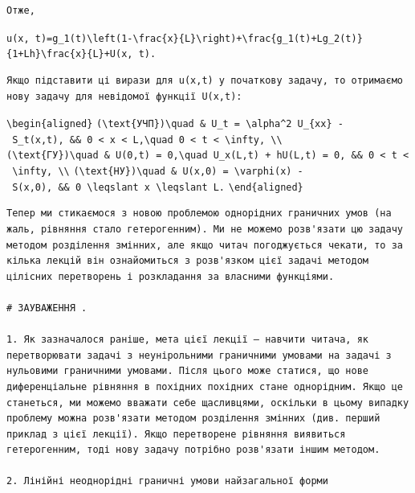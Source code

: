 \documentclass[
  ukrainian,
]{article}
\begin{document}
\begin{verbatim}
Отже,
\end{verbatim}

\texttt{u(x,\ t)=g\_1(t)\textbackslash{}left(1-\textbackslash{}frac\{x\}\{L\}\textbackslash{}right)+\textbackslash{}frac\{g\_1(t)+Lg\_2(t)\}\{1+Lh\}\textbackslash{}frac\{x\}\{L\}+U(x,\ t).}

\begin{verbatim}
Якщо підставити ці вирази для u(x,t) у початкову задачу, то отримаємо нову задачу для невідомої функції U(x,t):
\end{verbatim}

\texttt{\textbackslash{}begin\{aligned\}}
\texttt{(\textbackslash{}text\{УЧП\})\textbackslash{}quad\ \&\ U\_t\ =\ \textbackslash{}alpha\^{}2\ U\_\{xx\}\ -\ S\_t(x,t),\ \&\&\ 0\ \textless{}\ x\ \textless{}\ L,\textbackslash{}quad\ 0\ \textless{}\ t\ \textless{}\ \textbackslash{}infty,\ \textbackslash{}\textbackslash{}}
\texttt{(\textbackslash{}text\{ГУ\})\textbackslash{}quad\ \&\ U(0,t)\ =\ 0,\textbackslash{}quad\ U\_x(L,t)\ +\ hU(L,t)\ =\ 0,\ \&\&\ 0\ \textless{}\ t\ \textless{}\ \textbackslash{}infty,\ \textbackslash{}\textbackslash{}}
\texttt{(\textbackslash{}text\{НУ\})\textbackslash{}quad\ \&\ U(x,0)\ =\ \textbackslash{}varphi(x)\ -\ S(x,0),\ \&\&\ 0\ \textbackslash{}leqslant\ x\ \textbackslash{}leqslant\ L.}
\texttt{\textbackslash{}end\{aligned\}}

\begin{verbatim}
Тепер ми стикаємося з новою проблемою однорідних граничних умов (на жаль, рівняння стало гетерогенним). Ми не можемо розв'язати цю задачу методом розділення змінних, але якщо читач погоджується чекати, то за кілька лекцій він ознайомиться з розв'язком цієї задачі методом цілісних перетворень і розкладання за власними функціями.

# ЗАУВАЖЕННЯ .

1. Як зазначалося раніше, мета цієї лекції — навчити читача, як перетворювати задачі з неунірольними граничними умовами на задачі з нульовими граничними умовами. Після цього може статися, що нове диференціальне рівняння в похідних похідних стане однорідним. Якщо це станеться, ми можемо вважати себе щасливцями, оскільки в цьому випадку проблему можна розв'язати методом розділення змінних (див. перший приклад з цієї лекції). Якщо перетворене рівняння виявиться гетерогенним, тоді нову задачу потрібно розв'язати іншим методом.

2. Лінійні неоднорідні граничні умови найзагальної форми
\end{verbatim}
\end{document}
